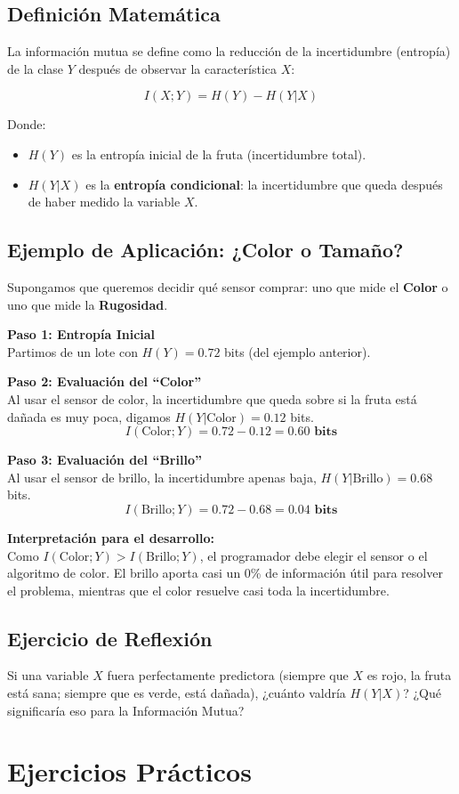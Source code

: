 \documentclass{article}
\begin{document}
\subsection{Definición Matemática}
La información mutua se define como la reducción de la incertidumbre (entropía) de la clase $Y$ después de observar la característica $X$:

\[ I(X;Y) = H(Y) - H(Y|X) \]

Donde:
\begin{itemize}
    \item $H(Y)$ es la entropía inicial de la fruta (incertidumbre total).
    \item $H(Y|X)$ es la \textbf{entropía condicional}: la incertidumbre que queda después de haber medido la variable $X$.
\end{itemize}

\subsection{Ejemplo de Aplicación: ¿Color o Tamaño?}
Supongamos que queremos decidir qué sensor comprar: uno que mide el \textbf{Color} o uno que mide la \textbf{Rugosidad}.

\textbf{Paso 1: Entropía Inicial} \\
Partimos de un lote con $H(Y) = 0.72$ bits (del ejemplo anterior).

\textbf{Paso 2: Evaluación del ``Color''} \\
Al usar el sensor de color, la incertidumbre que queda sobre si la fruta está dañada es muy poca, digamos $H(Y|\text{Color}) = 0.12$ bits.
\[ I(\text{Color};Y) = 0.72 - 0.12 = \mathbf{0.60 \text{ bits}} \]

\textbf{Paso 3: Evaluación del ``Brillo''} \\
Al usar el sensor de brillo, la incertidumbre apenas baja, $H(Y|\text{Brillo}) = 0.68$ bits.
\[ I(\text{Brillo};Y) = 0.72 - 0.68 = \mathbf{0.04 \text{ bits}} \]

\textbf{Interpretación para el desarrollo:} \\
Como $I(\text{Color};Y) > I(\text{Brillo};Y)$, el programador debe elegir el sensor o el algoritmo de color. El brillo aporta casi un 0\% de información útil para resolver el problema, mientras que el color resuelve casi toda la incertidumbre.

\subsection{Ejercicio de Reflexión}
Si una variable $X$ fuera perfectamente predictora (siempre que $X$ es rojo, la fruta está sana; siempre que es verde, está dañada), ¿cuánto valdría $H(Y|X)$? ¿Qué significaría eso para la Información Mutua?\section{Ejercicios Prácticos}
\end{document}

